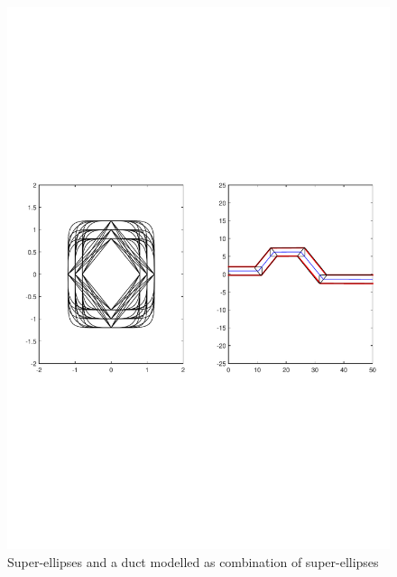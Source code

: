 \documentclass[12pt,a4]{article}
\begin{document}
\begin{figure}[h]
\centering
\includegraphics[scale=0.75]{figures/fig4.pdf}
\caption{ Super-ellipses and a duct modelled as combination of super-ellipses\label{fig:super-ellipses}}
\end{figure}
\end{document}
